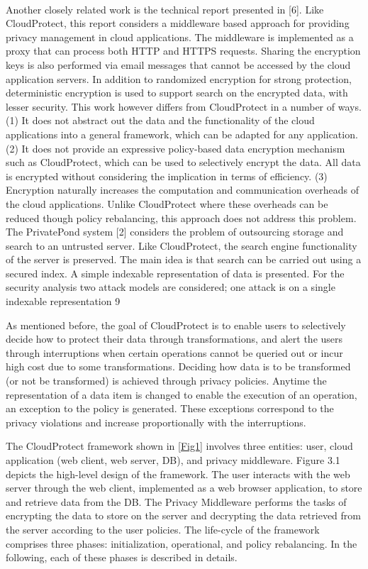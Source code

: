 \documentclass[11pt,onecolumn]{article}
\begin{document}
\paragraph{}
Another closely related work is the technical report presented in [6]. Like CloudProtect,
this report considers a middleware based approach for providing privacy management
in cloud applications. The middleware is implemented as a proxy that can
process both HTTP and HTTPS requests. Sharing the encryption keys is also performed
via email messages that cannot be accessed by the cloud application servers.
In addition to randomized encryption for strong protection, deterministic encryption
is used to support search on the encrypted data, with lesser security. This work however
differs from CloudProtect in a number of ways. (1) It does not abstract out the
data and the functionality of the cloud applications into a general framework, which
can be adapted for any application. (2) It does not provide an expressive policy-based
data encryption mechanism such as CloudProtect, which can be used to selectively
encrypt the data. All data is encrypted without considering the implication in terms
of efficiency. (3) Encryption naturally increases the computation and communication
overheads of the cloud applications. Unlike CloudProtect where these overheads can
be reduced though policy rebalancing, this approach does not address this problem.
The PrivatePond system [2] considers the problem of outsourcing storage and search
to an untrusted server. Like CloudProtect, the search engine functionality of the server
is preserved. The main idea is that search can be carried out using a secured index.
A simple indexable representation of data is presented. For the security analysis
two attack models are considered; one attack is on a single indexable representation
9

As mentioned before, the goal of CloudProtect is to enable users to selectively decide
how to protect their data through transformations, and alert the users through
interruptions when certain operations cannot be queried out or incur high cost due
to some transformations. Deciding how data is to be transformed (or not be transformed)
is achieved through privacy policies. Anytime the representation of a data
item is changed to enable the execution of an operation, an exception to the policy
is generated. These exceptions correspond to the privacy violations and increase
proportionally with the interruptions.


The CloudProtect framework shown in  \ref{Fig1}  involves three entities: user, cloud application (web
client, web server, DB), and privacy middleware. Figure 3.1 depicts the high-level
design of the framework. The user interacts with the web server through the web
client, implemented as a web browser application, to store and retrieve data from
the DB. The Privacy Middleware performs the tasks of encrypting the data to store
on the server and decrypting the data retrieved from the server according to the
user policies. The life-cycle of the framework comprises three phases: initialization,
operational, and policy rebalancing. In the following, each of these phases is described in details.
\end{document}
